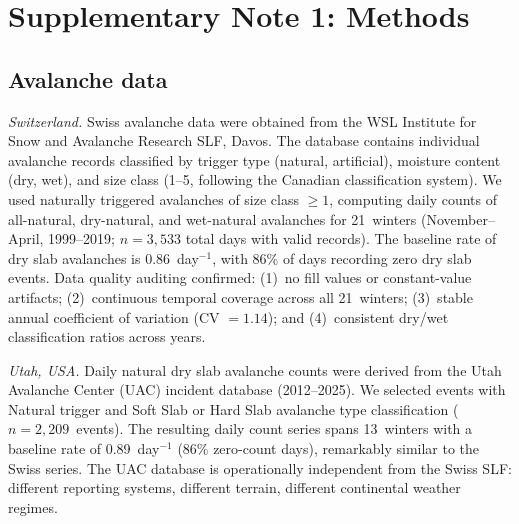 \documentclass[11pt,letterpaper]{article}
\begin{document}


\clearpage

\section{Supplementary Note 1: Methods}

\subsection{Avalanche data}

\textit{Switzerland.} Swiss avalanche data were obtained from the WSL Institute for Snow and Avalanche Research SLF, Davos. The database contains individual avalanche records classified by trigger type (natural, artificial), moisture content (dry, wet), and size class (1--5, following the Canadian classification system). We used naturally triggered avalanches of size class $\geq 1$, computing daily counts of all-natural, dry-natural, and wet-natural avalanches for 21~winters (November--April, 1999--2019; $n = 3{,}533$ total days with valid records). The baseline rate of dry slab avalanches is 0.86~day$^{-1}$, with 86\% of days recording zero dry slab events. Data quality auditing confirmed: (1)~no fill values or constant-value artifacts; (2)~continuous temporal coverage across all 21~winters; (3)~stable annual coefficient of variation (CV $= 1.14$); and (4)~consistent dry/wet classification ratios across years.

\textit{Utah, USA.} Daily natural dry slab avalanche counts were derived from the Utah Avalanche Center (UAC) incident database (2012--2025). We selected events with Natural trigger and Soft Slab or Hard Slab avalanche type classification ($n = 2{,}209$~events). The resulting daily count series spans 13~winters with a baseline rate of 0.89~day$^{-1}$ (86\% zero-count days), remarkably similar to the Swiss series. The UAC database is operationally independent from the Swiss SLF: different reporting systems, different terrain, different continental weather regimes.
\end{document}
